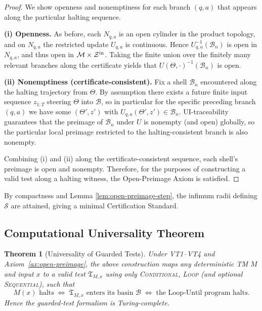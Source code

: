 \documentclass[12pt]{article}
\theoremstyle{definition}
\theoremstyle{plain}
\newtheorem{theorem}{Theorem}[section]
\begin{document}
\begin{proof}
We show openness and nonemptiness for each branch \((q,a)\) that appears along the particular halting sequence.

\medskip
\noindent\textbf{(i) Openness.}  
As before, each \(N_{q,a}\) is an open cylinder in the product topology, and on \(N_{q,a}\) the restricted update \(U_{q,a}\) is continuous. Hence \(U_{q,a}^{-1}(\mathcal B_n)\) is open in \(N_{q,a}\), and thus open in \(\mathcal M\times\mathcal Z^{\rm in}\). Taking the finite union over the finitely many relevant branches along the certificate yields that \(U(\Theta,\cdot)^{-1}(\mathcal B_n)\) is open.

\medskip
\noindent\textbf{(ii) Nonemptiness (certificate-consistent).}  
Fix a shell \(\mathcal B_n\) encountered along the halting trajectory from \(\Theta\). By assumption there exists a future finite input sequence \(z_{1:T}\) steering \(\Theta\) into \(\mathcal B\), so in particular for the specific preceding branch \((q,a)\) we have some \((\Theta',z')\) with \(U_{q,a}(\Theta',z')\in\mathcal B_n\). UI-traceability guarantees that the preimage of \(\mathcal B_n\) under \(U\) is nonempty (and open) globally, so the particular local preimage restricted to the halting-consistent branch is also nonempty.

\medskip
Combining (i) and (ii) along the certificate-consistent sequence, each shell’s preimage is open and nonempty.  Therefore, for the purposes of constructing a valid test along a halting witness, the Open-Preimage Axiom is satisfied.
\end{proof}



\noindent By compactness and Lemma \ref{lem:open-preimage-step}, the infimum radii defining \(\mathcal S\) are attained, giving a minimal Certification Standard.

\subsection{Computational Universality Theorem}
\label{subsec:universality-theorem}

\begin{theorem}[Universality of Guarded Tests]
\label{thm:universality}
Under VT1–VT4 and Axiom \ref{ax:open-preimage}, the above construction maps any deterministic TM \(M\) and input \(x\) to a valid test
\(\mathfrak T_{M,x}\) using only \textsc{Conditional}, \textsc{Loop} (and optional \textsc{Sequential}), such that
\[
  M(x)\text{ halts} 
  \;\iff\;
  \mathfrak T_{M,x}\text{ enters its basin } \mathcal B
  \;\iff\;
  \text{the Loop‑Until program halts.}
\]
Hence the guarded‑test formalism is Turing‑complete.
\end{theorem}
\end{document}
